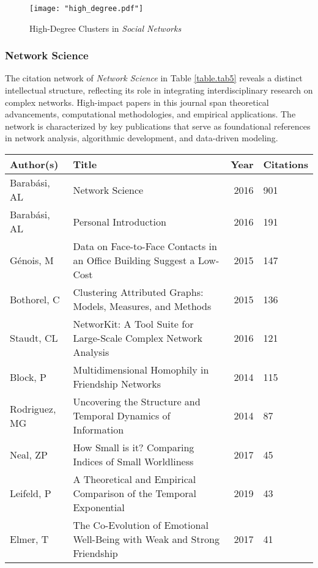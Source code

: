 \documentclass[twocolumn]{article}
\begin{document}
	\begin{figure}[htbp]
		\centering
		\texttt{[image: "high\_degree.pdf"]}
		\caption{High-Degree Clusters in \textit{Social Networks}}
		\label{fig.fig4}
	\end{figure}
	
	\subsubsection*{Network Science}
	
	
	The citation network of \textit{Network Science} in Table \ref{table.tab5} reveals a distinct intellectual structure, reflecting its role in integrating interdisciplinary research on complex networks. High-impact papers in this journal span theoretical advancements, computational methodologies, and empirical applications. The network is characterized by key publications that serve as foundational references in network analysis, algorithmic development, and data-driven modeling.
	
	\begin{table*}[htbp]
		\centering
		\scriptsize
		\caption{Top 10 Most Cited Papers in \textit{Network Science}}
		\label{table.tab5}
		\begin{tabularx}{\textwidth}{llrl}
			\toprule
			\textbf{Author(s)} & \textbf{Title} & \textbf{Year} & \textbf{Citations} \\
			\midrule
			Barabási, AL  & Network Science  & 2016  & 901 \\
			 Barabási, AL  & Personal Introduction  & 2016  & 191 \\
			Génois, M  & Data on Face-to-Face Contacts in an Office Building Suggest a Low-Cost  & 2015  & 147 \\
			 Bothorel, C  & Clustering Attributed Graphs: Models, Measures, and Methods  & 2015  & 136 \\
			Staudt, CL  & NetworKit: A Tool Suite for Large-Scale Complex Network Analysis  & 2016  & 121 \\
			Block, P  & Multidimensional Homophily in Friendship Networks  & 2014  & 115 \\
			Rodriguez, MG  & Uncovering the Structure and Temporal Dynamics of Information  & 2014  & 87 \\
			Neal, ZP  & How Small is it? Comparing Indices of Small Worldliness  & 2017  & 45 \\
			 Leifeld, P  & A Theoretical and Empirical Comparison of the Temporal Exponential  & 2019  & 43 \\
			Elmer, T  & The Co-Evolution of Emotional Well-Being with Weak and Strong Friendship  & 2017  & 41 \\
			\bottomrule
		\end{tabularx}
	\end{table*}
	
\end{document}
